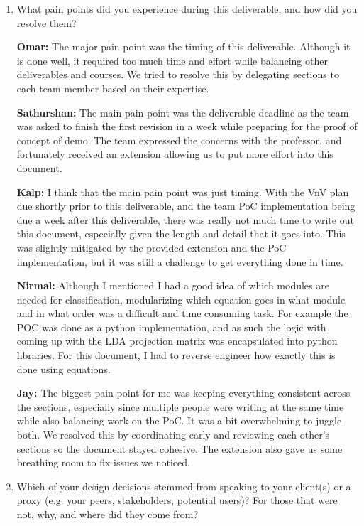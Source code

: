 \documentclass[12pt, titlepage]{article}
\begin{document}
\begin{enumerate}
  \item What pain points did you experience during this deliverable, and how did
    you resolve them?

  \textbf{Omar: } The major pain point was the timing of this deliverable.
  Although it is done well, it required too much time and effort while balancing
  other deliverables and courses. We tried to resolve this by delegating
  sections to each team member based on their expertise. 

  \textbf{Sathurshan:} The main pain point was the deliverable deadline as the
  team was asked to finish the first revision in a week while preparing for the
  proof of concept of demo. The team expressed the concerns with the professor,
  and fortunately received an extension allowing us to put more effort into this
  document.

  \textbf{Kalp:} I think that the main pain point was just timing. With the VnV
  plan due shortly prior to this deliverable, and the team PoC implementation
  being due a week after this deliverable, there was really not much time to
  write out this document, especially given the length and detail that it goes
  into. This was slightly mitigated by the provided extension and the PoC
  implementation, but it was still a challenge to get everything done in time.

  \textbf{Nirmal:} Although I mentioned I had a good idea of which modules are
  needed for classification, modularizing which equation goes in what module and
  in what order was a difficult and time consuming task. For example the POC was
  done as a python implementation, and as such the logic with coming up with the
  LDA projection matrix was encapsulated into python libraries. For this
  document, I had to reverse engineer how exactly this is done using equations. 

  \textbf{Jay:} The biggest pain point for me was keeping everything consistent
  across the sections, especially since multiple people were writing at the same
  time while also balancing work on the PoC. It was a bit overwhelming to juggle
  both. We resolved this by coordinating early and reviewing each other's
  sections so the document stayed cohesive. The extension also gave us some
  breathing room to fix issues we noticed.

  \item Which of your design decisions stemmed from speaking to your client(s)
  or a proxy (e.g. your peers, stakeholders, potential users)? For those that
  were not, why, and where did they come from?


\end{enumerate}
\end{document}
